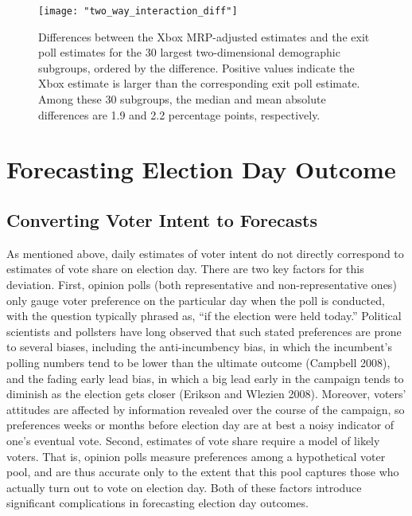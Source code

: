 \begin{figure}
  \centering
  \texttt{[image: "two\_way\_interaction\_diff"]}
  \caption{Differences between the Xbox MRP-adjusted estimates and
    the exit poll estimates for the 30 largest two-dimensional demographic
    subgroups, ordered by the difference.  Positive values indicate the Xbox
    estimate is larger than the corresponding exit poll estimate.  Among these 30
    subgroups, the median and mean absolute differences are 1.9 and 2.2
    percentage points, respectively.}
  \label{fig:30groups}
\end{figure}

\section{Forecasting Election Day
Outcome}\label{forecasting-election-day-outcome}

\subsection{Converting Voter Intent to
Forecasts}\label{converting-voter-intent-to-forecasts}

As mentioned above, daily estimates of voter intent do not directly
correspond to estimates of vote share on election day. There are two key
factors for this deviation. First, opinion polls (both representative
and non-representative ones) only gauge voter preference on the
particular day when the poll is conducted, with the question typically
phrased as, ``if the election were held today.'' Political scientists
and pollsters have long observed that such stated preferences are prone
to several biases, including the anti-incumbency bias, in which the
incumbent's polling numbers tend to be lower than the ultimate outcome
(Campbell 2008), and the fading early lead bias, in which a big lead
early in the campaign tends to diminish as the election gets closer
(Erikson and Wlezien 2008). Moreover, voters' attitudes are affected by
information revealed over the course of the campaign, so preferences
weeks or months before election day are at best a noisy indicator of
one's eventual vote. Second, estimates of vote share require a model of
likely voters. That is, opinion polls measure preferences among a
hypothetical voter pool, and are thus accurate only to the extent that
this pool captures those who actually turn out to vote on election day.
Both of these factors introduce significant complications in forecasting
election day outcomes.


